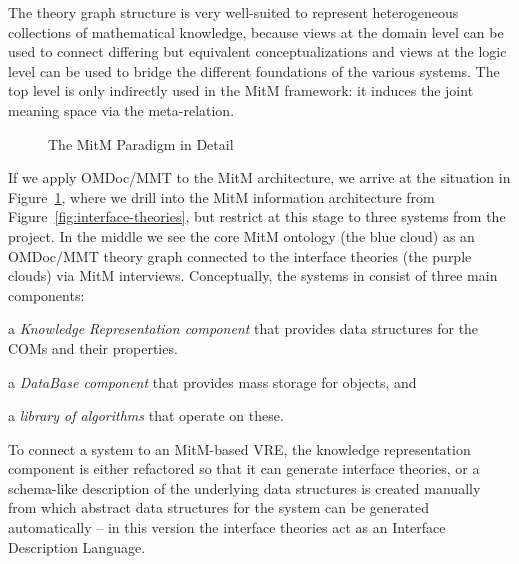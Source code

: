 The theory graph structure is very well-suited to represent heterogeneous collections of
mathematical knowledge, because views at the domain level can be used to connect differing
but equivalent conceptualizations and views at the logic level can be used to bridge the
different foundations of the various systems. The top level is only indirectly used in
the MitM framework: it induces the joint meaning space via the meta-relation.

\begin{figure}[ht]\centering
  
  \caption{The MitM Paradigm in Detail}\label{fig:mitm}
\end{figure}
If we apply OMDoc/MMT to the MitM architecture, we arrive at the situation in
Figure~\ref{fig:mitm}, where we drill into the MitM information architecture from
Figure~\ref{fig:interface-theories}, but restrict at this stage to three systems from the \ODK
project. In the middle we see the core MitM ontology (the blue cloud) as an OMDoc/MMT
theory graph connected to the interface theories (the purple clouds) via MitM
interviews. Conceptually, the systems in \ODK consist of three main components:
\begin{compactenum}[\em i\rm)]
\item a \emph{Knowledge Representation component} that provides data structures for the
  COMs and their properties.
\item a \emph{DataBase component} that provides mass storage for objects, and 
\item a \emph{library of algorithms} that operate on these.
\end{compactenum}
To connect a system to an MitM-based VRE, the knowledge representation component is either
refactored so that it can generate interface theories, or a schema-like description of the
underlying data structures is created manually from which abstract data structures for the
system can be generated automatically -- in this version the interface theories act as an
Interface Description Language.

